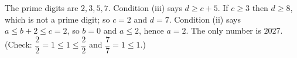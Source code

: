 The prime digits are $2,3,5,7$. Condition (iii) says $d\ge c+5$. If $c\ge3$ then $d\ge8$, which is not a prime digit; so $c=2$ and $d=7$. Condition (ii) says $a\le b+2\le c=2$, so $b=0$ and $a\le2$, hence $a=2$. The only number is $\boxed{2027}$. (Check: $\dfrac22=1\le1\le\dfrac22$ and $\dfrac{7}{7}=1\le1$.)
